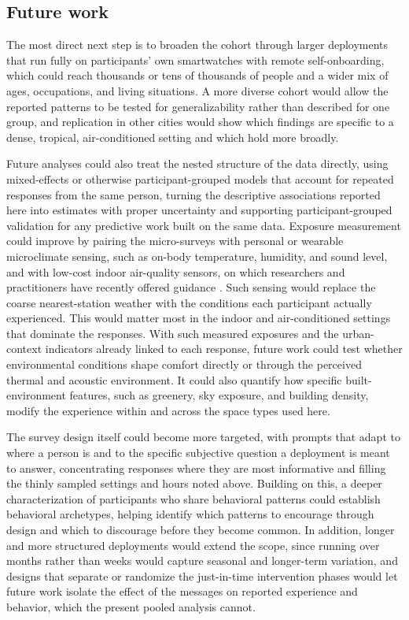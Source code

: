 \documentclass[]{interact}
\begin{document}
\subsection{Future work}\label{sec:disc-future}
The most direct next step is to broaden the cohort through larger deployments that run fully on participants' own smartwatches with remote self-onboarding, which could reach thousands or tens of thousands of people and a wider mix of ages, occupations, and living situations.
A more diverse cohort would allow the reported patterns to be tested for generalizability rather than described for one group, and replication in other cities would show which findings are specific to a dense, tropical, air-conditioned setting and which hold more broadly.

Future analyses could also treat the nested structure of the data directly, using mixed-effects or otherwise participant-grouped models that account for repeated responses from the same person, turning the descriptive associations reported here into estimates with proper uncertainty and supporting participant-grouped validation for any predictive work built on the same data. 
Exposure measurement could improve by pairing the micro-surveys with personal or wearable microclimate sensing, such as on-body temperature, humidity, and sound level, and with low-cost indoor air-quality sensors, on which researchers and practitioners have recently offered guidance \citep{Parkinson2026-am}.
Such sensing would replace the coarse nearest-station weather with the conditions each participant actually experienced.
This would matter most in the indoor and air-conditioned settings that dominate the responses.
With such measured exposures and the urban-context indicators already linked to each response, future work could test whether environmental conditions shape comfort directly or through the perceived thermal and acoustic environment.
It could also quantify how specific built-environment features, such as greenery, sky exposure, and building density, modify the experience within and across the space types used here.

The survey design itself could become more targeted, with prompts that adapt to where a person is and to the specific subjective question a deployment is meant to answer, concentrating responses where they are most informative and filling the thinly sampled settings and hours noted above.
Building on this, a deeper characterization of participants who share behavioral patterns could establish behavioral archetypes, helping identify which patterns to encourage through design and which to discourage before they become common. 
In addition, longer and more structured deployments would extend the scope, since running over months rather than weeks would capture seasonal and longer-term variation, and designs that separate or randomize the just-in-time intervention phases would let future work isolate the effect of the messages on reported experience and behavior, which the present pooled analysis cannot.
\end{document}
